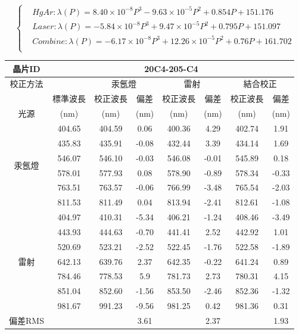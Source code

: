 \begin{equation}\label{eq4.1}
	\begin{cases}		
		& Hg Ar: \lambda(P) = 8.40\times 10^{-8}P^3 -9.63\times 10^{-5}P^2+0.854P+151.176\\
		& Laser: \lambda(P) = -5.84\times 10^{-8}P^3 + 9.47\times 10^{-5}P^2+0.795P+151.097\\
		& Combine: \lambda(P) = -6.17\times 10^{-8}P^3 + 12.26\times 10^{-5}P^2+0.76P+161.702\\
	\end{cases}
\end{equation}
\begin{center}
\label{晶片20C4-205-C4三種校正方法比較表}
\begin{tabularx}{\textwidth}{cccccccc}
	\hline\hline
	晶片ID&\multicolumn{7}{c}{20C4-205-C4}\\%
	\hline
	校正方法&&\multicolumn{2}{c}{汞氬燈}&\multicolumn{2}{c}{雷射}&\multicolumn{2}{c}{結合校正}\\
	\hline
	    &標準波長&校正波長&偏差&校正波長&偏差&校正波長&偏差\\
	光源&(nm)   &(nm)    &(nm)&(nm)   &(nm)&(nm)   &(nm)\\
	\hline
	\multirow{6}{*}{汞氬燈}
	&404.65	&404.59	&0.06	&400.36	&4.29	&402.74	&1.91\\
	&435.83	&435.91	&-0.08	&432.44	&3.39	&434.14	&1.69\\
	&546.07	&546.10	&-0.03	&546.08	&-0.01	&545.89	&0.18\\
	&578.01	&577.93	&0.08	&578.90	&-0.89	&578.34	&-0.33\\
	&763.51	&763.57	&-0.06	&766.99	&-3.48	&765.54	&-2.03\\
	&811.53	&811.49	&0.04	&813.94	&-2.41	&812.61	&-1.08\\
	\hline
	\multirow{7}{*}{雷射}
	&404.97	&410.31	&-5.34	&406.21	&-1.24	&408.46	&-3.49\\
	&443.93	&444.63	&-0.70	&441.41	&2.52	&442.92	&1.01\\
	&520.69	&523.21	&-2.52	&522.45	&-1.76	&522.58	&-1.89\\
	&642.13	&639.76	&2.37	&642.35	&-0.22	&641.24	&0.89\\
	&784.46	&778.53	&5.9	&781.73	&2.73	&780.31	&4.15\\
	&851.04	&852.60	&-1.56	&853.50	&-2.46	&852.36	&-1.32\\
	&981.67	&991.23	&-9.56	&981.25	&0.42	&981.36	&0.31\\	
	\hline
	偏差RMS& & &3.61& &2.37& &1.93\\
	\hline\hline
\end{tabularx}
\end{center}


